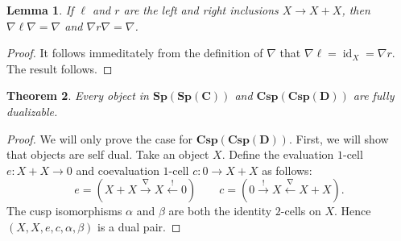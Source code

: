 \documentclass[11pt]{amsart}
\newcommand{\from}{\colon}
\newcommand{\xto}[1]{\xrightarrow{#1}}
\newcommand{\bispsp}[1]{\mathbf{Sp(Sp(#1))}}
\newcommand{\bicspcsp}[1]{\mathbf{Csp(Csp(#1))}}
\DeclareMathOperator{\id}{id}
\newtheorem{thm}{Theorem}[section]
\newtheorem{lem}[thm]{Lemma}
\theoremstyle{remark}
\theoremstyle{definition}
\begin{document}
\begin{lem}
	If $\ell$ and $r$ are the left and right inclusions $X \to X+X$, then $\nabla \ell \nabla = \nabla$ and $\nabla r \nabla = \nabla$.
\end{lem}

\begin{proof}
	It follows immeditately from the definition of $\nabla$ that $\nabla \ell = \id_X = \nabla r$.  The result follows.  
\end{proof}

\begin{thm}
	\label{thm:SpansSpansAreFullyDualBicat}
	Every object in $\bispsp{C}$ and $\bicspcsp{D}$ are fully dualizable.
\end{thm}

\begin{proof}
	We will only prove the case for $\bicspcsp{D}$.  First, we will show that objects are self dual.  Take an object $X$. Define the evaluation $1$-cell $e \from X+X \to 0$ and coevaluation $1$-cell $c \from 0 \to X+X$ as follows:
	\[
		e = (X+X \xto{\nabla} X \xleftarrow{!} 0)
		\quad \quad
		c = (0 \xto{!} X \xleftarrow{\nabla} X+X ).
	\]
	The cusp isomorphisms $\alpha$ and $\beta$ are both the identity $2$-cells on $X$. Hence $(X,X,e,c,\alpha,\beta)$ is a dual pair.
	

\end{proof}
\end{document}
